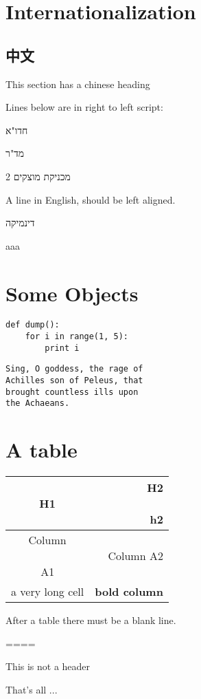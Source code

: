 \section{Internationalization}



\subsection{中文}

This section has a chinese heading



Lines below are in right to left script:



חדו"א

מד"ר

מכניקת מוצקים 2

A line in English, should be left aligned.

דינמיקה



aaa





\section{Some Objects}




\begin{lstlisting}
def dump():
	for i in range(1, 5):
		print i

\end{lstlisting}





\begin{lstlisting}
Sing, O goddess, the rage of
Achilles son of Peleus, that
brought countless ills upon
the Achaeans.

\end{lstlisting}


\section{A table}

\begin{tabular}{ |c|r| }
\hline
 H1 & \shortstack[r]{H2\\\\h2} \tabularnewline
\hline
\hline
 \shortstack[c]{Column\\\\ A1} &  Column A2 \tabularnewline
\hline
 a very long cell & \textbf{bold column} \tabularnewline
\hline
\end{tabular}


After a table there must be a blank line.





====

This is not a header



That's all ...

